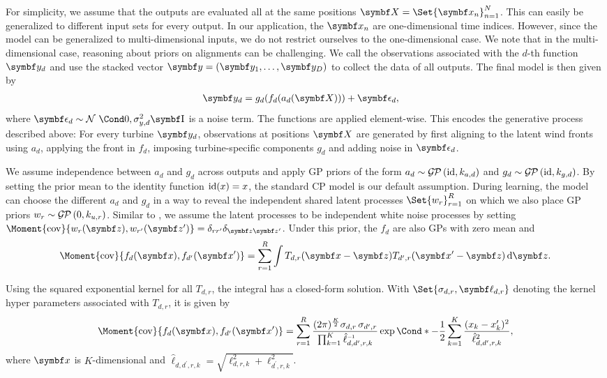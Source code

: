 For simplicity, we assume that the outputs are evaluated all at the same positions $\mat{X} = \Set{\mat{x}_n}_{n=1}^N$.
This can easily be generalized to different input sets for every output.
In our application, the $\mat{x}_n$ are one-dimensional time indices.
However, since the model can be generalized to multi-dimensional inputs, we do not restrict ourselves to the one-dimensional case.
We note that in the multi-dimensional case, reasoning about priors on alignments can be challenging.
We call the observations associated with the $d$-th function $\mat{y}_d$ and use the stacked vector $\mat{y} = \left( \mat{y}_1, \dots, \mat{y}_D \right)$ to collect the data of all outputs.
The final model is then given by
\begin{align}
    \mat{y}_d & = g_d(f_d(a_d(\mat{X}))) + \mat{\epsilon}_d,
\end{align}
where $\mat{\epsilon}_d \sim \Gaussian{0, \sigma_{y, d}^2\Eye}$ is a noise term.
The functions are applied element-wise.
This encodes the generative process described above:
For every turbine $\rv{y}_d$, observations at positions $\rv{X}$ are generated by first aligning to the latent wind fronts using $a_d$, applying the front in $f_d$, imposing turbine-specific components $g_d$ and adding noise in $\rv{\epsilon}_d$.

We assume independence between $a_d$ and $g_d$ across outputs and apply GP priors of the form $a_d \sim \operatorname{\mathcal{G\mkern-1mu P}\mkern3mu}(\operatorname{id}, k_{a, d})$ and $g_d \sim \operatorname{\mathcal{G\mkern-1mu P}\mkern3mu}(\operatorname{id}, k_{g, d})$.
By setting the prior mean to the identity function $\operatorname{id}(x) = x$, the standard CP model is our default assumption.
During learning, the model can choose the different $a_d$ and $g_d$ in a way to reveal the independent shared latent processes $\Set{w_r}_{r=1}^R$ on which we also place GP priors $w_r \sim \operatorname{\mathcal{G\mkern-1mu P}\mkern3mu}(0, k_{u, r})$.
Similar to \textcite{boyle_dependent_2004}, we assume the latent processes to be independent white noise processes by setting $\Moment{\cov}{w_r(\mat{z}), w_{r^\prime}(\mat{z^\prime})} = \delta_{rr^\prime}\delta_{\mat{z}\mat{z^\prime}}$.
Under this prior, the $f_d$ are also GPs with zero mean and
\begin{align}
    \Moment{\cov}{f_d(\mat{x}), f_{d^\prime}(\mat{x^\prime})}
    = \sum_{r=1}^R \int T_{d,r}(\mat{x} - \mat{z}) T_{d^\prime,r}(\mat{x^\prime} - \mat{z}) \diff \mat{z}.
\end{align}

Using the squared exponential kernel for all $T_{d, r}$, the integral has a closed-form solution.
With $\Set{\sigma_{d,r}, \mat{\ell}_{d, r}}$ denoting the kernel hyper parameters associated with $T_{d,r}$, it is given by
\begin{align}
    \label{eq:alignment:dependent_kernel}
    \Moment{\cov}{f_d(\mat{x}), f_{d^\prime}(\mat{x^\prime})} = \sum_{r=1}^R \frac{(2\pi)^{\frac{K}{2}}\sigma_{d, r}\,\sigma_{d^\prime, r}}{\prod_{k=1}^K \hat{\ell}_{d, d^\prime, r, k}\inv} \Fun*{\exp}{-\frac{1}{2} \sum_{k=1}^K \frac{(x_k - x^\prime_k)^2}{\hat{\ell}_{d, d^\prime, r, k}^2}},
\end{align}
where $\mat{x}$ is $K$-dimensional and $\hat{\ell}_{d, d^\prime, r, k} = \sqrt{\ell_{d, r, k}^2 + \ell_{d^\prime, r, k}^2}$.

